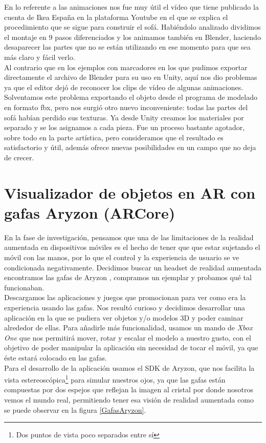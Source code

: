 En lo referente a las animaciones nos fue muy útil el vídeo que tiene publicado la cuenta de Ikea España en la plataforma Youtube \cite{IkeaYT} en el que se explica el procedimiento que se sigue para construir el sofá. Habiéndolo analizado dividimos el montaje en 9 pasos diferenciados y los animamos también en Blender, haciendo desaparecer las partes que no se están utilizando en ese momento para que sea más claro y fácil verlo.\\

Al contrario que en los ejemplos con marcadores en los que pudimos exportar directamente el archivo de Blender para su uso en Unity, aquí nos dio problemas ya que el editor dejó de reconocer los clips de vídeo de algunas animaciones. Solventamos este problema exportando el objeto desde el programa de modelado en formato fbx, pero nos surgió otro nuevo inconveniente: todas las partes del sofá habían perdido sus texturas. Ya desde Unity creamos los materiales por separado y se los asignamos a cada pieza.
Fue un proceso bastante agotador, sobre todo en la parte artística, pero consideramos que el resultado es satisfactorio y útil, además ofrece nuevas posibilidades en un campo que no deja de crecer.

\clearpage
\section{Visualizador de objetos en AR con gafas Aryzon (ARCore)}
En la fase de investigación, pensamos que una de las limitaciones de la realidad aumentada en dispositivos móviles es el hecho de tener que que estar sujetando el móvil con las manos, por lo que el control y la experiencia de usuario se ve condicionada negativamente. Decidimos buscar un headset de realidad aumentada encontramos las gafas de Aryzon \cite{Aryzon}, compramos un ejemplar y probamos qué tal funcionaban.\\

Descargamos las aplicaciones y juegos que promocionan para ver como era la experiencia usando las gafas. Nos resultó curioso y decidimos desarrollar una aplicación en la que se pudiera ver objetos y/o modelos 3D y poder caminar alrededor de ellas. Para añadirle más funcionalidad, usamos un mando de \textit{Xbox One} que nos permitirá mover, rotar y escalar el modelo a nuestro gusto, con el objetivo de poder manipular la aplicación sin necesidad de tocar el móvil, ya que éste estará colocado en las gafas.\\

Para el desarrollo de la aplicación usamos el SDK de Aryzon, que nos facilita la vista estereoscópica\footnote{ Dos puntos de vista poco separados entre sí} para simular nuestros ojos, ya que las gafas están compuestas por dos espejos que reflejan la imagen al cristal por donde nosotros vemos el mundo real, permitiendo tener esa visión de realidad aumentada como se puede observar en la figura \ref{GafasAryzon}.

